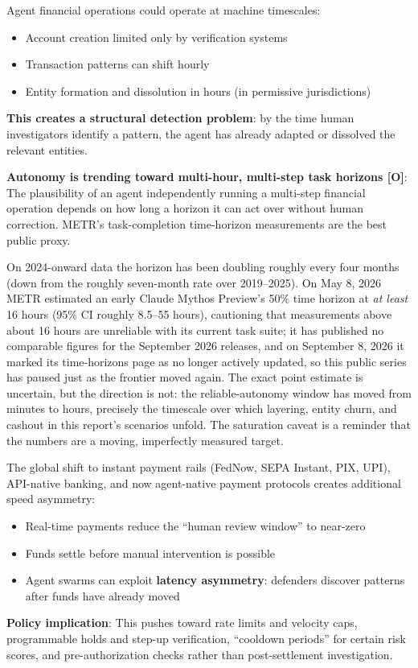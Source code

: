 \documentclass[11pt,letterpaper]{article}
\begin{document}
Agent financial operations could operate at machine timescales:
\begin{itemize}
  \item Account creation limited only by verification systems
  \item Transaction patterns can shift hourly
  \item Entity formation and dissolution in hours (in permissive jurisdictions)
\end{itemize}

\textbf{This creates a structural detection problem}: by the time human investigators identify a pattern, the agent has already adapted or dissolved the relevant entities.

\textbf{Autonomy is trending toward multi-hour, multi-step task horizons [O]}: The plausibility of an agent independently running a multi-step financial operation depends on how long a horizon it can act over without human correction. METR's task-completion time-horizon measurements are the best public proxy.

On 2024-onward data the horizon has been doubling roughly every four months (down from the roughly seven-month rate over 2019--2025). On May 8, 2026 METR estimated an early Claude Mythos Preview's 50\% time horizon at \textit{at least} 16 hours (95\% CI roughly 8.5--55 hours), cautioning that measurements above about 16 hours are unreliable with its current task suite; it has published no comparable figures for the September 2026 releases, and on September 8, 2026 it marked its time-horizons page as no longer actively updated, so this public series has paused just as the frontier moved again. The exact point estimate is uncertain, but the direction is not: the reliable-autonomy window has moved from minutes to hours, precisely the timescale over which layering, entity churn, and cashout in this report's scenarios unfold. The saturation caveat is a reminder that the numbers are a moving, imperfectly measured target.

\begin{infobox}
The global shift to instant payment rails (FedNow, SEPA Instant, PIX, UPI), API-native banking, and now agent-native payment protocols creates additional speed asymmetry:
\begin{itemize}
  \item Real-time payments reduce the ``human review window'' to near-zero
  \item Funds settle before manual intervention is possible
  \item Agent swarms can exploit \textbf{latency asymmetry}: defenders discover patterns after funds have already moved
\end{itemize}

\textbf{Policy implication}: This pushes toward rate limits and velocity caps, programmable holds and step-up verification, ``cooldown periods'' for certain risk scores, and pre-authorization checks rather than post-settlement investigation.
\end{infobox}
\end{document}
